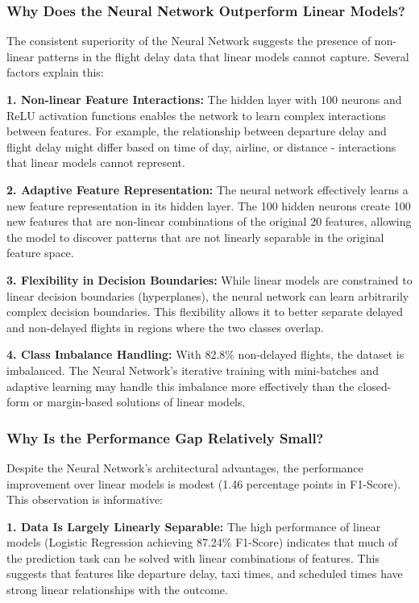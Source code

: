 \documentclass[sigconf]{acmart}
\begin{document}
\subsubsection{Why Does the Neural Network Outperform Linear Models?}

The consistent superiority of the Neural Network suggests the presence of non-linear patterns in the flight delay data that linear models cannot capture. Several factors explain this:

\textbf{1. Non-linear Feature Interactions:} The hidden layer with 100 neurons and ReLU activation functions enables the network to learn complex interactions between features. For example, the relationship between departure delay and flight delay might differ based on time of day, airline, or distance - interactions that linear models cannot represent.

\textbf{2. Adaptive Feature Representation:} The neural network effectively learns a new feature representation in its hidden layer. The 100 hidden neurons create 100 new features that are non-linear combinations of the original 20 features, allowing the model to discover patterns that are not linearly separable in the original feature space.

\textbf{3. Flexibility in Decision Boundaries:} While linear models are constrained to linear decision boundaries (hyperplanes), the neural network can learn arbitrarily complex decision boundaries. This flexibility allows it to better separate delayed and non-delayed flights in regions where the two classes overlap.

\textbf{4. Class Imbalance Handling:} With 82.8\% non-delayed flights, the dataset is imbalanced. The Neural Network's iterative training with mini-batches and adaptive learning may handle this imbalance more effectively than the closed-form or margin-based solutions of linear models.

\subsubsection{Why Is the Performance Gap Relatively Small?}

Despite the Neural Network's architectural advantages, the performance improvement over linear models is modest (1.46 percentage points in F1-Score). This observation is informative:

\textbf{1. Data Is Largely Linearly Separable:} The high performance of linear models (Logistic Regression achieving 87.24\% F1-Score) indicates that much of the prediction task can be solved with linear combinations of features. This suggests that features like departure delay, taxi times, and scheduled times have strong linear relationships with the outcome.
\end{document}
